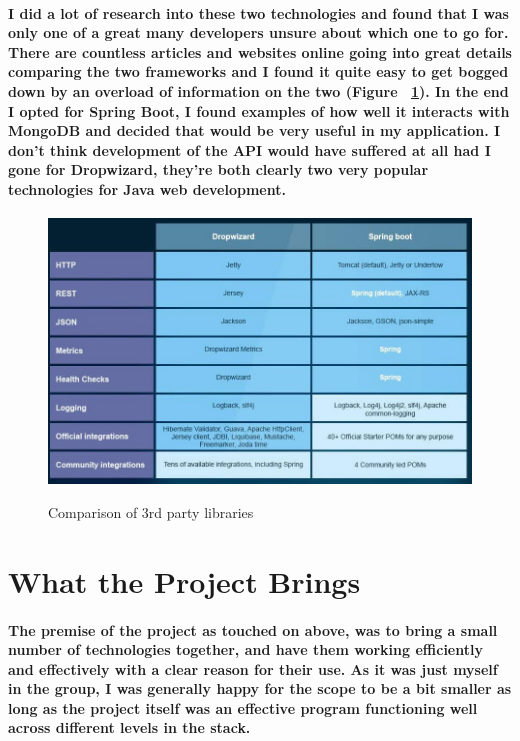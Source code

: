 \paragraph{I did a lot of research into these two technologies and found that I was only one of a great many developers unsure about which one to go for. There are countless articles and websites online going into great details comparing the two frameworks and I found it quite easy to get bogged down by an overload of information on the two (Figure ~\ref{drop_label}). In the end I opted for Spring Boot, I found examples of how well it interacts with MongoDB and decided that would be very useful in my application. I don't think development of the API would have suffered at all had I gone for Dropwizard, they're both clearly two very popular technologies for Java web development.}
\begin{figure}[h]
    \centering
    \includegraphics[scale=0.3]{Images/dropwizard.jpeg} 
    \label{drop_label}
    \caption{Comparison of 3rd party libraries}
\end{figure}

\section{What the Project Brings}
\paragraph{The premise of the project as touched on above, was to bring a small number of technologies together, and have them working efficiently and effectively with a clear reason for their use. As it was just myself in the group, I was generally happy for the scope to be a bit smaller as long as the project itself was an effective program functioning well across different levels in the stack.}
